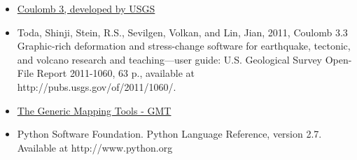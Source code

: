 \begin{itemize}
\item
  \href{https://earthquake.usgs.gov/research/software/coulomb/}{Coulomb
  3, developed by USGS}
\item
  Toda, Shinji, Stein, R.S., Sevilgen, Volkan, and Lin, Jian, 2011,
  Coulomb 3.3 Graphic-rich deformation and stress-change software for
  earthquake, tectonic, and volcano research and teaching---user guide:
  U.S. Geological Survey Open-File Report 2011-1060, 63 p., available at
  http://pubs.usgs.gov/of/2011/1060/.
\item
  \href{http://gmt.soest.hawaii.edu/}{The Generic Mapping Tools - GMT}
\item
  Python Software Foundation. Python Language Reference, version 2.7.
  Available at http://www.python.org
\end{itemize}
